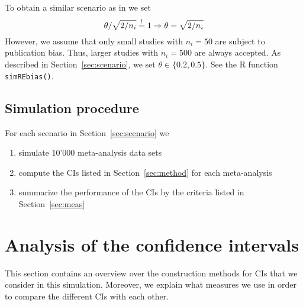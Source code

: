 \documentclass[letterpaper, 12pt]{article}
\begin{document}
To obtain a similar scenario as in \citet{henm:copa:10} we set
$$
\theta / \sqrt{2/n_i}  \overset{!}{=} 1 \Rightarrow \theta = \sqrt{2/n_i}
\vadjust{\todo{Where does this come from?}}
$$
However, we assume that only small studies with $n_i = 50$ are subject to
publication bias. Thus, larger studies with $n_i = 500$ are always accepted.
As described in Section~\ref{sec:scenario}, we set $\theta \in \{0.2, 0.5\}$. See the R function \texttt{simREbias()}.



\subsection{Simulation procedure}
For each scenario in Section~\ref{sec:scenario} we
\begin{enumerate}
\item simulate 10'000 meta-analysis data sets
\item compute the CIs listed in Section~\ref{sec:method} for each meta-analysis
\item summarize the performance of the CIs by the criteria listed in
  Section~\ref{sec:meas}
\end{enumerate}

\section{Analysis of the confidence intervals}

This section contains an overview over the construction methods for CIs
that we consider in this simulation. Moreover, we explain what measures we
use in order to compare the different CIs with each other.
\end{document}
